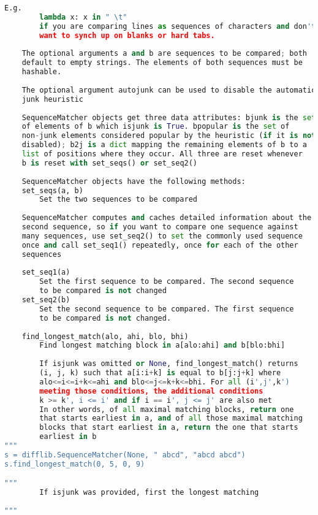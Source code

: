 \documentclass[a4paper,landscape]{report}
\begin{document}
\begin{lstlisting}[language=Python]
    E.g.
        lambda x: x in " \t"
        if you are comparing lines as sequences of characters and don't
        want to synch up on blanks or hard tabs.
    
    The optional arguments a and b are sequences to be compared; both
    default to empty strings. The elements of both sequences must be
    hashable.
    
    The optional argument autojunk can be used to disable the automatic
    junk heuristic
    
    SequenceMatcher objects get three data attributes: bjunk is the set
    of elements of b which isjunk is True. bpopular is the set of 
    non-junk elements considered popular by the heuristic (if it is not
    disabled); b2j is a dict mapping the remaining elements of b to a
    list of positions where they occur. All three are reset whenever
    b is reset with set_seqs() or set_seq2()
    
    SequenceMatcher objects have the following methods:
    set_seqs(a, b)
        Set the two sequences to be compared
    
    SequenceMatcher computes and caches detailed information about the
    second sequence, so if you want to compare one sequence against
    many sequences, use set_seq2() to set the commonly used sequence
    once and call set_seq1() repeatedly, once for each of the other
    sequences
    
    set_seq1(a)
        Set the first sequence to be compared. The second sequence
        to be compared is not changed
    set_seq2(b)
        Set the second sequence to be compared. The first sequence
        to be compared is not changed.
        
    find_longest_match(alo, ahi, blo, bhi)
        Find longest matching block in a[alo:ahi] and b[blo:bhi]
        
        If isjunk was omitted or None, find_longest_match() returns
        (i, j, k) such that a[i:i+k] is equal to b[j:j+k] where 
        alo<=i<=i+k<=ahi and blo<=j<=k+k<=bhi. For all (i',j',k')
        meeting those conditions, the additional conditions 
        k >= k', i <= i' and if i == i', j <= j' are also met
        In other words, of all maximal matching blocks, return one
        that starts earliest in a, and of all those maximal matching
        blocks that start earliest in a, return the one that starts
        earliest in b
"""
s = difflib.SequenceMatcher(None, " abcd", "abcd abcd")
s.find_longest_match(0, 5, 0, 9)

"""
        If isjunk was provided, first the longest matching
        
"""
\end{lstlisting}
\end{document}
